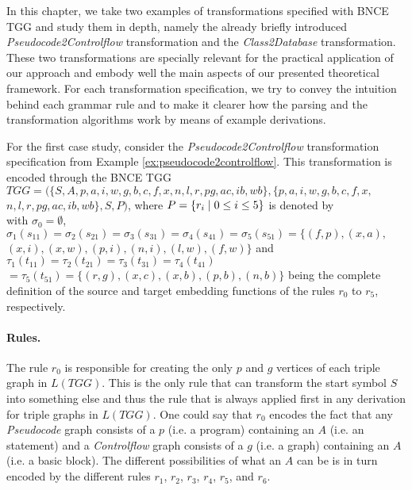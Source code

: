 In this chapter, we take two examples of transformations specified with BNCE TGG and study them in depth, namely the already briefly introduced \emph{Pseudocode2Controlflow} transformation and the \emph{Class2Database} transformation. These two transformations are specially relevant for the practical application of our approach and embody well the main aspects of our presented theoretical framework. For each transformation specification, we try to convey the intuition behind each grammar rule and to make it clearer how the parsing and the transformation algorithms work by means of example derivations.

For the first case study, consider the \emph{Pseudocode2Controlflow} transformation specification from Example \ref{ex:pseudocode2controlflow}. This transformation is encoded through the BNCE TGG $TGG = (\{S, A, p, a, i, w, g, b, c, f, x, n, l, r, pg, ac, ib, wb\}, \{p, a, i, w, g, b, c, f, x,$ $ n, l, r, pg, ac, ib, wb\}, S, P)$, where $P = \{r_i \; | \; 0 \le i \le 5\}$ is denoted by\\


\noindent
with $\sigma_0 = \emptyset$, $\sigma_1(s_{11}) = \sigma_2(s_{21}) = \sigma_3(s_{31}) = \sigma_4(s_{41}) =\sigma_5(s_{51}) = \{ (f,p), (x,a), $ $(x,i), (x,w), (p,i), (n,i), (l,w), (f,w) \}$ and $\tau_1(t_{11}) = \tau_2(t_{21}) = \tau_3(t_{31}) = \tau_4(t_{41}) $ $= \tau_5(t_{51}) = \{ (r,g), (x,c), (x,b), (p,b), (n,b)\}$ being the complete definition of the source and target embedding functions of the rules $r_0$ to $r_5$, respectively.

\paragraph*{Rules. } The rule $r_0$ is responsible for creating the only $p$ and $g$ vertices of each triple graph in $L(TGG)$. This is the only rule that can transform the start symbol $S$ into something else and thus the rule that is always applied first in any derivation for triple graphs in $L(TGG)$. One could say that $r_0$ encodes the fact that any \emph{Pseudocode} graph consists of a $p$ (i.e. a program) containing an $A$ (i.e. an statement) and a \emph{Controlflow} graph consists of a $g$ (i.e. a graph) containing an $A$ (i.e. a basic block). The different possibilities of what an $A$ can be is in turn encoded by the different rules $r_1$, $r_2$, $r_3$, $r_4$, $r_5$, and $r_6$.

